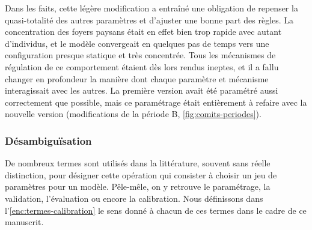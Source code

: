 Dans les faits, cette légère modification a entraîné une obligation de repenser la quasi-totalité des autres paramètres et d'ajuster une bonne part des règles. 
La concentration des foyers paysans était en effet bien trop rapide avec autant d'individus, et le modèle convergeait en quelques pas de temps vers une configuration presque statique et très concentrée.
Tous les mécanismes de régulation de ce comportement étaient dès lors rendus ineptes, et il a fallu changer en profondeur la manière dont chaque paramètre et mécanisme interagissait avec les autres.
La première version avait été paramétré aussi correctement que possible, mais ce paramétrage était entièrement à refaire avec la nouvelle version (modifications de la période B, \cref{fig:comits-periodes}).


\subsubsection{Désambiguïsation}

De nombreux termes sont utilisés dans la littérature, souvent sans réelle distinction, pour désigner cette opération qui consister à choisir un jeu de paramètres pour un modèle.
Pêle-mêle, on y retrouve le paramétrage, la validation, l'évaluation ou encore la calibration.
Nous définissons dans l'\cref{enc:termes-calibration} le sens donné à chacun de ces termes dans le cadre de ce manuscrit.
\bigskip

